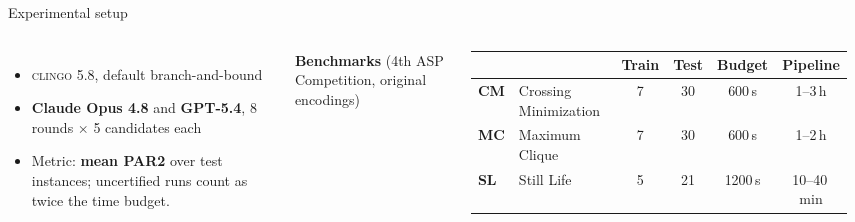 \documentclass[10pt,aspectratio=169]{beamer}
\newcommand{\clingo}{\textsc{clingo}}
\begin{document}
\begin{frame}{Experimental setup}
\begin{columns}[T,onlytextwidth]
\begin{itemize}
  \item \clingo{} 5.8, default branch-and-bound
  \item \textbf{Claude Opus 4.8} and \textbf{GPT-5.4}, 8 rounds $\times$ 5 candidates each
    \item Metric: \textbf{mean PAR2} over test instances;
uncertified runs count as twice the time budget.
\end{itemize}
\textbf{Benchmarks} (4th ASP Competition, original encodings)\\[0.4em]
\footnotesize\setlength{\tabcolsep}{4pt}
\begin{tabular}{@{}llcccc@{}}
\toprule
 & & Train & Test & Budget & Pipeline \\
\midrule
\textbf{CM} & Crossing Minimization & 7 & 30 & 600\,s & 1--3\,h \\
\textbf{MC} & Maximum Clique & 7 & 30 & 600\,s & 1--2\,h \\
\textbf{SL} & Still Life & 5 & 21 & 1200\,s & 10--40\,min \\
\bottomrule
\end{tabular}\\[0.8em]
\end{columns}
\end{frame}



\end{document}
